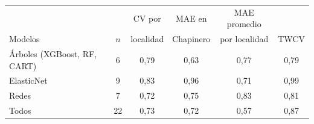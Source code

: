 \begin{tabular}{l c c c c c}
\toprule
& & CV por & MAE en & MAE promedio & \\
Modelos & $n$ & localidad & Chapinero & por localidad & TWCV \\
\midrule
Árboles (XGBoost, RF, CART) & 6 & 0,79 & 0,63 & 0,77 & 0,79 \\
ElasticNet & 9 & 0,83 & 0,96 & 0,71 & 0,99 \\
Redes & 7 & 0,72 & 0,75 & 0,83 & 0,81 \\
\midrule Todos & 22 & 0,73 & 0,72 & 0,57 & 0,87 \\
\bottomrule
\end{tabular}

